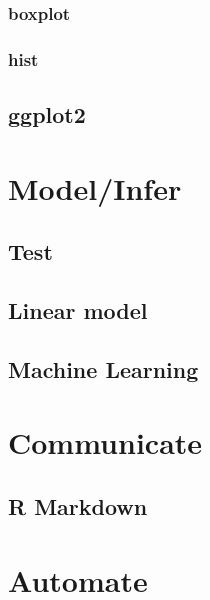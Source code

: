 \documentclass[
  12pt,
]{book}
\begin{document}
\hypertarget{boxplot}{%
\section{boxplot}\label{boxplot}}

\hypertarget{hist}{%
\section{hist}\label{hist}}

\hypertarget{ggplot2}{%
\chapter{ggplot2}\label{ggplot2}}

\hypertarget{part-modelinfer}{%
\part{Model/Infer}\label{part-modelinfer}}

\hypertarget{test}{%
\chapter{Test}\label{test}}

\hypertarget{linear-model}{%
\chapter{Linear model}\label{linear-model}}

\hypertarget{machine-learning}{%
\chapter{Machine Learning}\label{machine-learning}}

\hypertarget{part-communicate}{%
\part{Communicate}\label{part-communicate}}

\hypertarget{r-markdown}{%
\chapter{R Markdown}\label{r-markdown}}

\hypertarget{part-automate}{%
\part{Automate}\label{part-automate}}
\end{document}
